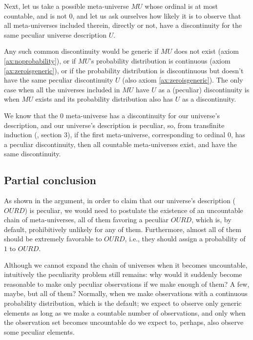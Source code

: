 \documentclass[a4paper
,draft
]{article}
\def\our_description{OURD}
\begin{document}
Next, let us take a possible meta-universe $MU$ whose ordinal is at most
countable, and is not $0$, and let us
ask ourselves how likely it is to observe that all meta-universes
included therein, directly or not, have a discontinuity for
the same peculiar universe description $U$.

Any such common discontinuity would be generic if $MU$ does not exist
(axiom \ref{ax:noprobability}), or if $MU$'s probability distribution
is continuous (axiom \ref{ax:zeroisgeneric}),
or if the probability distribution is discontinuous
but doesn't have the same peculiar discontinuity $U$
(also axiom \ref{ax:zeroisgeneric}).
The only case when all the universes included in $MU$ have $U$ as a
(peculiar) discontinuity is when $MU$ exists and its probability distribution
also has $U$ as a discontinuity.

We know that the $0$ meta-universe has a discontinuity for
our universe's description, and our universe's description is peculiar, so,
from transfinite induction (\textcite{Cohen1966}, section 3),
if the first meta-universe,
corresponding to ordinal $0$, has a peculiar discontinuity, then all countable
meta-universes exist, and have the same discontinuity.

\subsection{Partial conclusion}

As shown in the argument, in order to claim that our universe's description
($\our_description$) is peculiar,
we would need to postulate the
existence of an uncountable chain of meta-universes, all of them favoring a
peculiar $\our_description$, which is, by default,
prohibitively unlikely for any of them. Furthermore, almost all of them
should be extremely favorable to $\our_description$, i.e.,
they should assign a probability of $1$ to $\our_description$.

Although we cannot expand the chain of universes when it becomes uncountable,
intuitively the peculiarity problem
still remains: why would it suddenly become reasonable to make
only peculiar observations if we make enough of them? A few, maybe, but all
of them? Normally, when we make
observations with a continuous probability distribution, which is the default;
we expect to observe only generic elements as long as we make a
countable number of observations, and only when the observation set
becomes uncountable do we expect to, perhaps, also observe some peculiar elements.
\end{document}
